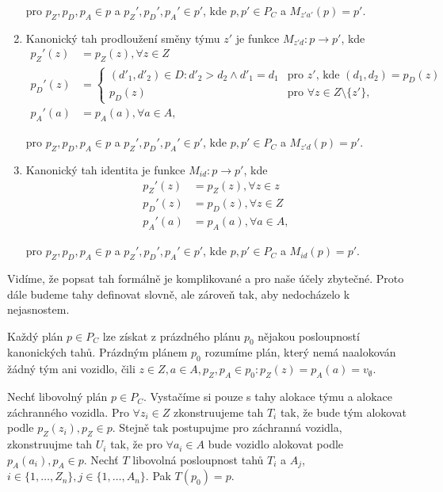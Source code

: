 \begin{definice}
\begin{enumerate}
      pro $p_Z, p_D, p_A \in p$ a $p_Z', p_D', p_A' \in p'$, kde $p, p' \in P_C$ a $M_{z'a'}(p) = p'$.

    \item
      Kanonický tah prodloužení směny týmu $z'$ je funkce $M_{z'd} : p \rightarrow p'$, kde
      \begin{align*}
        p_Z'(z) &= p_Z(z), \forall z \in Z \\
        p_D'(z) &=
          \begin{cases}
            (d'_1, d'_2) \in D \colon d'_2 > d_2 \land d'_1 = d_1  & \text{pro $z'$, kde $(d_1, d_2) = p_{D}(z)$} \\
            p_D(z) & \text{pro $\forall z \in Z \setminus \{ z' \}$},
          \end{cases}
          \\
        p_A'(a) &= p_A(a), \forall a \in A,
      \end{align*}

      pro $p_Z, p_D, p_A \in p$ a $p_Z', p_D', p_A' \in p'$, kde $p, p' \in P_C$ a $M_{z'd}(p) = p'$.

    \item
      Kanonický tah identita je funkce $M_{id}: p \rightarrow p'$, kde
      \begin{align*}
        p_Z'(z) &= p_Z(z), \forall z \in z \\
        p_D'(z) &= p_D(z), \forall z \in Z \\
        p_A'(a) &= p_A(a), \forall a \in A,
      \end{align*}

      pro $p_Z, p_D, p_A \in p$ a $p_Z', p_D', p_A' \in p'$, kde $p, p' \in P_C$ a $M_{id}(p) = p'$.
  \end{enumerate}

\end{definice}

Vidíme, že popsat tah formálně je komplikované a pro naše účely zbytečné.
Proto dále budeme tahy definovat slovně, ale zároveň tak, aby nedocházelo k nejasnostem.

\begin{veta}\label{veta:vztahMeziPlanyAKan}
  Každý plán $p \in P_C$ lze získat z prázdného plánu $p_0$ nějakou posloupností kanonických tahů.
  Prázdným plánem $p_0$ rozumíme plán, který nemá naalokován žádný tým ani vozidlo, čili $z \in Z, a \in A, p_Z, p_A \in p_0 \colon p_Z(z) = p_A(a) = v_{\emptyset}$.
\end{veta}
\begin{dukaz}
  Nechť libovolný plán $p \in P_C$.
  Vystačíme si pouze s tahy alokace týmu a alokace záchranného vozidla.
  Pro $\forall z_i \in Z$ zkonstruujeme tah $T_i$ tak, že bude tým alokovat podle $p_Z(z_i), p_Z \in p$.
  Stejně tak postupujme pro záchranná vozidla, zkonstruujme tah $U_i$ tak, že pro $\forall a_i \in A$ bude vozidlo alokovat podle $p_A(a_i), p_A \in p$.
  Nechť $T$ libovolná posloupnost tahů $T_i$ a $A_j$, $i \in \{ 1, \dots , Z_n\}, j \in \{ 1, \dots , A_n \}$.
  Pak $T(p_0) = p$.
\end{dukaz}

